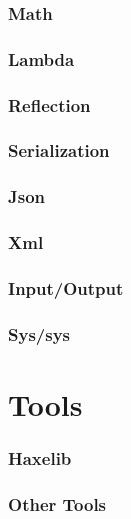\documentclass[a4paper,oneside]{book}
\begin{document}
\section{Math}
\label{std-Math}

\section{Lambda}
\label{std-Lambda}

\section{Reflection}
\label{std-reflection}

\section{Serialization}
\label{std-serialization}

\section{Json}
\label{std-Json}

\section{Xml}
\label{std-Xml}

\section{Input/Output}
\label{std-input-output}

\section{Sys/sys}
\label{std-sys}

\part{Tools}

\section{Haxelib}
\label{tools-haxelib}

\section{Other Tools}
\label{tools-other}
\end{document}
